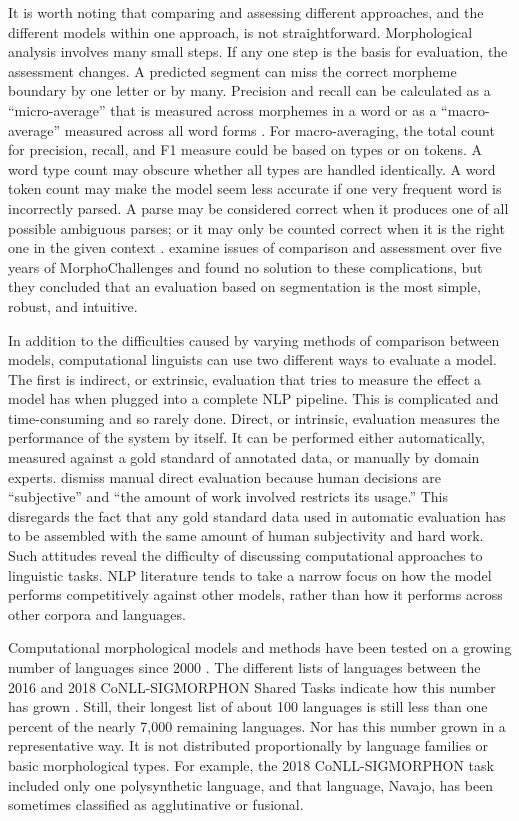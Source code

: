 \documentclass[12pt]{article}
\begin{document}
It is worth noting that comparing and assessing different approaches, and the different models within one approach, is not straightforward. Morphological analysis involves many small steps. If any one step is the basis for evaluation, the assessment changes. A predicted segment can miss the correct morpheme boundary by one letter or by many. Precision and recall can be calculated as a ``micro-average'' that is measured across morphemes in a word or as a ``macro-average'' measured across all word forms \cite{ruokolainen_supervised_2013}. For macro-averaging, the total count for precision, recall, and F1 measure could be based on types or on tokens. A word type count may obscure whether all types are handled identically. A word token count may make the model seem less accurate if one very frequent word is incorrectly parsed. A parse may be considered correct when it produces one of all possible ambiguous parses; or it may only be counted correct when it is the right one in the given context \cite{ruokolainen_supervised_2013}.  examine issues of comparison and assessment over five years of MorphoChallenges and found no solution to these complications, but they concluded that an evaluation based on segmentation is the most simple, robust, and intuitive. 

In addition to the difficulties caused by varying methods of comparison between models, computational linguists can use two different ways to evaluate a model. The first is indirect, or extrinsic, evaluation that tries to measure the effect a model has when plugged into a complete NLP pipeline. This is complicated and time-consuming and so rarely done. Direct, or intrinsic, evaluation measures the performance of the system by itself. It can be performed either automatically, measured against a gold standard of annotated data, or manually by domain experts.  dismiss manual direct evaluation because human decisions are ``subjective'' and ``the amount of work involved restricts its usage.'' This disregards the fact that any gold standard data used in automatic evaluation has to be assembled with the same amount of human subjectivity and hard work. Such attitudes reveal the difficulty of discussing computational approaches to linguistic tasks. NLP literature tends to take a narrow focus on how the model performs competitively against other models, rather than how it performs across other corpora and languages.

Computational morphological models and methods have been tested on a growing number of languages since 2000 \cite{hammarstrom_unsupervised_2011}. The different lists of languages between the 2016 and 2018 CoNLL-SIGMORPHON Shared Tasks indicate how this number has grown \cite{cotterell-etal-2016-sigmorphon,cotterell_cross-lingual_2017,cotterell_conllsigmorphon_2018}. Still, their longest list of about 100 languages is still less than one percent of the nearly 7,000 remaining languages. Nor has this number grown in a representative way. It is not distributed proportionally by language families or basic morphological types. For example, the 2018 CoNLL-SIGMORPHON task included only one polysynthetic language, and that language, Navajo, has been sometimes classified as agglutinative or fusional.
\end{document}
